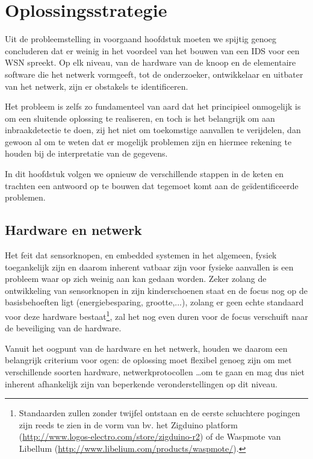 
\chapter{Oplossingsstrategie}
\label{chapter:oplossingsstrategie}

Uit de probleemstelling in voorgaand hoofdstuk moeten we spijtig genoeg
concluderen dat er weinig in het voordeel van het bouwen van een IDS voor een
WSN spreekt. Op elk niveau, van de hardware van de knoop en de elementaire
software die het netwerk vormgeeft, tot de onderzoeker, ontwikkelaar en
uitbater van het netwerk, zijn er obstakels te identificeren.

Het probleem is zelfs zo fundamenteel van aard dat het principieel onmogelijk
is om een sluitende oplossing te realiseren, en toch is het belangrijk om aan
inbraakdetectie te doen, zij het niet om toekomstige aanvallen te verijdelen,
dan gewoon al om te weten dat er mogelijk problemen zijn en hiermee rekening
te houden bij de interpretatie van de gegevens.

In dit hoofdstuk volgen we opnieuw de verschillende stappen in de keten en
trachten een antwoord op te bouwen dat tegemoet komt aan de ge\"identificeerde
problemen.

\section{Hardware en netwerk}
\label{section:solution-node-wsn}

Het feit dat sensorknopen, en embedded systemen in het algemeen, fysiek
toegankelijk zijn en daarom inherent vatbaar zijn voor fysieke aanvallen is een
probleem waar op zich weinig aan kan gedaan worden. Zeker zolang de
ontwikkeling van sensorknopen in zijn kinderschoenen staat en de focus nog op
de basisbehoeften ligt (energiebesparing, grootte,...), zolang er geen echte
standaard voor deze hardware bestaat\footnote{Standaarden zullen zonder twijfel
ontstaan en de eerste schuchtere pogingen zijn reeds te zien in de vorm van bv.
het Zigduino platform (\url{http://www.logos-electro.com/store/zigduino-r2}) of
de Waspmote van Libellum (\url{http://www.libelium.com/products/waspmote/}).},
zal het nog even duren voor de focus verschuift naar de beveiliging van de
hardware.

Vanuit het oogpunt van de hardware en het netwerk, houden we daarom een
belangrijk criterium voor ogen: de oplossing moet flexibel genoeg zijn om met
verschillende soorten hardware, netwerkprotocollen \dots om te gaan en mag dus
niet inherent afhankelijk zijn van beperkende veronderstellingen op dit niveau.

